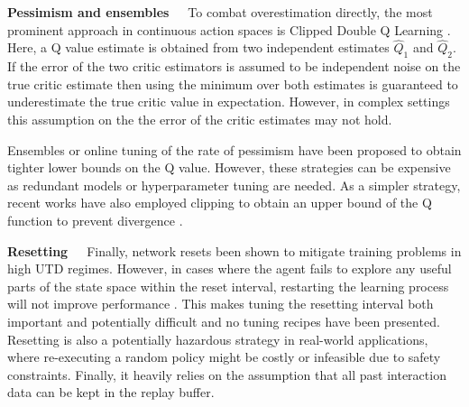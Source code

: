 \textbf{Pessimism and ensembles}~~~To combat overestimation directly, the most prominent approach in continuous action spaces is Clipped Double Q Learning \parencite{fujimoto2018addressing}. 
Here, a Q value estimate is obtained from two independent estimates $\hat{Q}_1$ and $\hat{Q}_2$.
If the error of the two critic estimators is assumed to be independent noise on the true critic estimate 
then using the minimum over both estimates is guaranteed to underestimate the true critic value in expectation.
However, in complex settings this assumption on the the error of the critic estimates may not hold. 

Ensembles \parencite{lan2020maxmin,chen2021randomized,hiraoka2022dropout,farebrother2023protovalue} or online tuning of the rate of pessimism \parencite{moskovitz2021tactical} have been proposed to obtain tighter lower bounds on the Q value.
However, these strategies can be expensive as redundant models or hyperparameter tuning are needed.
As a simpler strategy, recent works have also employed clipping to obtain an upper bound of the Q function to prevent divergence \parencite{fujimoto2024sale}.

\textbf{Resetting}~~~Finally, network resets been shown to mitigate training problems \parencite{nikishin2022primacy,doro2023barrier,schwarzer2023bigger,nauman2024bigger} in high UTD regimes.
However, in cases where the agent fails to explore any useful parts of the state space within the reset interval, restarting the learning process will not improve performance \parencite{hussing2024dissecting}.
This makes tuning the resetting interval both important and potentially difficult and no tuning recipes have been presented.
Resetting is also a potentially hazardous strategy in real-world applications, where re-executing a random policy might be costly or infeasible due to safety constraints.
Finally, it heavily relies on the assumption that all past interaction data can be kept in the replay buffer.



